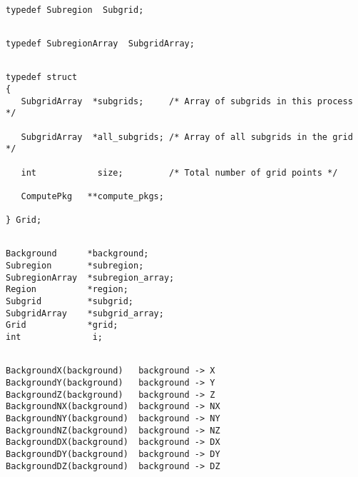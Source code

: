 {\newpage\clearpage
{}%
\begin{display}\begin{verbatim}

typedef Subregion  Subgrid;\end{verbatim}
\end{display}%
\lthtmlfigureZ
\lthtmlcheckvsize\clearpage}

{\newpage\clearpage
{}%
\begin{display}\begin{verbatim}

typedef SubregionArray  SubgridArray;\end{verbatim}
\end{display}%
\lthtmlfigureZ
\lthtmlcheckvsize\clearpage}

{\newpage\clearpage
{}%
\begin{display}\begin{verbatim}

typedef struct
{
   SubgridArray  *subgrids;     /* Array of subgrids in this process */

   SubgridArray  *all_subgrids; /* Array of all subgrids in the grid */

   int            size;         /* Total number of grid points */

   ComputePkg   **compute_pkgs;

} Grid;\end{verbatim}
\end{display}%
\lthtmlfigureZ
\lthtmlcheckvsize\clearpage}

{\newpage\clearpage
{}%
\begin{display}\begin{verbatim}

Background      *background;
Subregion       *subregion;
SubregionArray  *subregion_array;
Region          *region;
Subgrid         *subgrid;
SubgridArray    *subgrid_array;
Grid            *grid;
int              i;\end{verbatim}
\end{display}%
\lthtmlfigureZ
\lthtmlcheckvsize\clearpage}

{\newpage\clearpage
{}%
\begin{display}\begin{verbatim}

BackgroundX(background)   background -> X
BackgroundY(background)   background -> Y
BackgroundZ(background)   background -> Z
BackgroundNX(background)  background -> NX
BackgroundNY(background)  background -> NY
BackgroundNZ(background)  background -> NZ
BackgroundDX(background)  background -> DX
BackgroundDY(background)  background -> DY
BackgroundDZ(background)  background -> DZ\end{verbatim}
\end{display}%
\lthtmlfigureZ
\lthtmlcheckvsize\clearpage}

